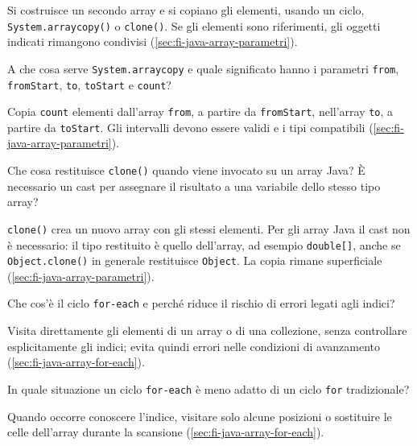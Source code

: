 Si costruisce un secondo array e si copiano gli elementi, usando
un ciclo, \texttt{System.arraycopy()} o \texttt{clone()}.
Se gli elementi sono riferimenti, gli oggetti indicati
rimangono condivisi (\cref{sec:fi-java-array-parametri}).

\begin{exercise}
\label{ex:fi-esercizi-array-arraycopy}
A che cosa serve \texttt{System.arraycopy} e quale significato
hanno i parametri \texttt{from}, \texttt{fromStart}, \texttt{to},
\texttt{toStart} e \texttt{count}?
\end{exercise}

Copia \texttt{count} elementi dall'array \texttt{from}, a partire
da \texttt{fromStart}, nell'array \texttt{to}, a partire da
\texttt{toStart}. Gli intervalli devono essere validi e i tipi
compatibili (\cref{sec:fi-java-array-parametri}).

\begin{exercise}
\label{ex:fi-esercizi-array-clone}
Che cosa restituisce \texttt{clone()} quando viene invocato su
un array Java? È necessario un cast per assegnare il risultato
a una variabile dello stesso tipo array?
\end{exercise}

\texttt{clone()} crea un nuovo array con gli stessi elementi.
Per gli array Java il cast non è necessario: il tipo restituito
è quello dell'array, ad esempio \texttt{double[]}, anche se
\texttt{Object.clone()} in generale restituisce \texttt{Object}.
La copia rimane superficiale
(\cref{sec:fi-java-array-parametri}).

\begin{exercise}
\label{ex:fi-esercizi-array-foreach}
Che cos'è il ciclo \texttt{for-each} e perché riduce il rischio
di errori legati agli indici?
\end{exercise}

Visita direttamente gli elementi di un array o di una collezione,
senza controllare esplicitamente gli indici; evita quindi errori
nelle condizioni di avanzamento
(\cref{sec:fi-java-array-for-each}).

\begin{exercise}
\label{ex:fi-esercizi-array-foreach-limiti}
In quale situazione un ciclo \texttt{for-each} è meno adatto
di un ciclo \texttt{for} tradizionale?
\end{exercise}

Quando occorre conoscere l'indice, visitare solo alcune posizioni
o sostituire le celle dell'array durante la scansione
(\cref{sec:fi-java-array-for-each}).

